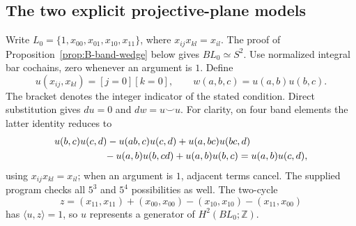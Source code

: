 \subsection{The two explicit projective-plane models}
Write $L_0=\{1,x_{00},x_{01},x_{10},x_{11}\}$, where
$x_{ij}x_{kl}=x_{il}$.  The proof of
Proposition~\ref{prop:B-band-wedge} below gives $BL_0\simeq S^2$.
Use normalized integral bar cochains, zero whenever an argument is $1$.
Define
\[
 u(x_{ij},x_{kl})=[j=0][k=0],\qquad
 w(a,b,c)=u(a,b)u(b,c).
\]
The bracket denotes the integer indicator of the stated condition.
Direct substitution gives $du=0$ and $dw=u\smile u$.  For clarity,
on four band elements the latter identity reduces to
\[
\begin{split}
 &u(b,c)u(c,d)-u(ab,c)u(c,d)+u(a,bc)u(bc,d)\\
 &\hspace{18mm}-u(a,b)u(b,cd)+u(a,b)u(b,c)
   =u(a,b)u(c,d),
\end{split}
\]
using $x_{ij}x_{kl}=x_{il}$; when an argument is $1$, adjacent terms
cancel.  The supplied program checks all $5^3$ and $5^4$ possibilities
as well.  The two-cycle
\[
 z=(x_{11},x_{11})+(x_{00},x_{00})
       -(x_{10},x_{10})-(x_{11},x_{00})
\]
has $\langle u,z\rangle=1$, so $u$ represents a generator of
$H^2(BL_0;\mathbb Z)$.

